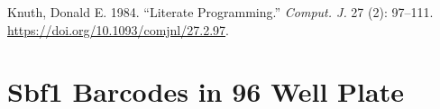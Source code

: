 \documentclass[
  letterpaper,
  DIV=11,
  numbers=noendperiod]{scrreprt}
\newlength{\cslhangindent}
\newlength{\cslentryspacingunit} %
\newenvironment{CSLReferences}[2] %
 {%
  \setlength{\parindent}{0pt}
  \ifodd #1
  \let\oldpar\par
  \def\par{\hangindent=\cslhangindent\oldpar}
  \fi
  \setlength{\parskip}{#2\cslentryspacingunit}
 }%
 {}
\begin{document}

\hypertarget{refs}{}
\begin{CSLReferences}{1}{0}
\leavevmode{}%
Knuth, Donald E. 1984. {``Literate Programming.''} \emph{Comput. J.} 27
(2): 97--111. \url{https://doi.org/10.1093/comjnl/27.2.97}.

\end{CSLReferences}

\cleardoublepage
{}
{}
\appendix

\hypertarget{sbf1-barcodes-in-96-well-plate}{%
\chapter{Sbf1 Barcodes in 96 Well
Plate}\label{sbf1-barcodes-in-96-well-plate}}
\end{document}
